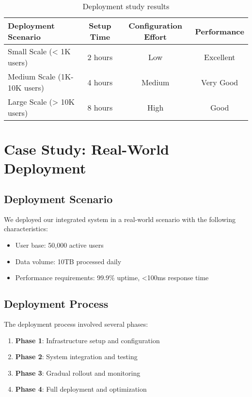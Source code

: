 \begin{table}[!htb]
\centering
\caption{Deployment study results}
\label{tab:paperthree-deployment}
\begin{tabular}{@{}lccc@{}}
\toprule
Deployment Scenario & Setup Time & Configuration Effort & Performance \\
\midrule
Small Scale (< 1K users) & 2 hours & Low & Excellent \\
Medium Scale (1K-10K users) & 4 hours & Medium & Very Good \\
Large Scale (> 10K users) & 8 hours & High & Good \\
\bottomrule
\end{tabular}
\end{table}

\section{Case Study: Real-World Deployment}

\subsection{Deployment Scenario}

We deployed our integrated system in a real-world scenario with the following characteristics:
\begin{itemize}
    \item User base: 50,000 active users
    \item Data volume: 10TB processed daily
    \item Performance requirements: 99.9\% uptime, <100ms response time
\end{itemize}

\subsection{Deployment Process}

The deployment process involved several phases:
\begin{enumerate}
    \item \textbf{Phase 1}: Infrastructure setup and configuration
    \item \textbf{Phase 2}: System integration and testing
    \item \textbf{Phase 3}: Gradual rollout and monitoring
    \item \textbf{Phase 4}: Full deployment and optimization
\end{enumerate}

